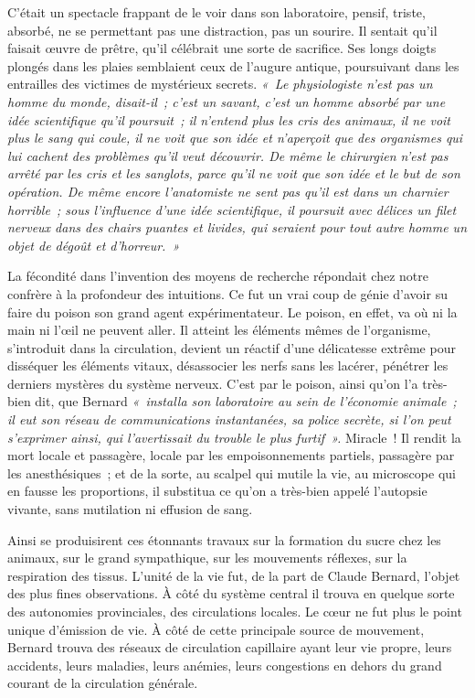 \documentclass[french,twoside]{book} %
\newcommand\persName[1]{#1}
\begin{document}
C’était un spectacle frappant de le voir dans son laboratoire, pensif, triste, absorbé, ne se permettant pas une distraction, pas un sourire. Il sentait qu’il faisait œuvre de prêtre, qu’il célébrait une sorte de sacrifice. Ses longs doigts plongés dans les plaies semblaient ceux de l’augure antique, poursuivant dans les entrailles des victimes de mystérieux secrets. \emph{« Le physiologiste n’est pas un homme du monde, disait-il ; c’est un savant, c’est un homme absorbé par une idée scientifique qu’il poursuit ; il n’entend plus les cris des animaux, il ne voit plus le sang qui coule, il ne voit que son idée et n’aperçoit que des organismes qui lui cachent des problèmes qu’il veut découvrir. De même le chirurgien n’est pas arrêté par les cris et les sanglots, parce qu’il ne voit que son idée et le but de son opération. De même encore l’anatomiste ne sent pas qu’il est dans un charnier horrible ; sous l’influence d’une idée scientifique, il poursuit avec délices un filet nerveux dans des chairs puantes et livides, qui seraient pour tout autre homme un objet de dégoût et d’horreur. »}\par
La fécondité dans l’invention des moyens de recherche répondait chez notre confrère à la profondeur des intuitions. Ce fut un vrai coup de génie d’avoir su faire du poison son grand agent expérimentateur. Le poison, en effet, va où ni la main ni l’œil ne peuvent aller. Il atteint les éléments mêmes de l’organisme, s’introduit dans la circulation, devient un réactif d’une délicatesse extrême pour disséquer les éléments vitaux, désassocier les nerfs sans les lacérer, pénétrer les derniers mystères du système nerveux. C’est par le poison, ainsi qu’on l’a très-bien dit, que {\persName Bernard} \emph{« installa son laboratoire au sein de l’économie animale ; il eut son réseau de communications instantanées, sa police secrète, si l’on peut s’exprimer ainsi, qui l’avertissait du trouble le plus furtif ».} Miracle ! Il rendit la mort locale et passagère, locale par les empoisonnements partiels, passagère par les anesthésiques ; et de la sorte, au scalpel qui mutile la vie, au microscope qui en fausse les proportions, il substitua ce qu’on a très-bien appelé l’autopsie vivante, sans mutilation ni effusion de sang.\par
Ainsi se produisirent ces étonnants travaux sur la formation du sucre chez les animaux, sur le grand sympathique, sur les mouvements réflexes, sur la respiration des tissus. L’unité de la vie fut, de la part de {\persName Claude Bernard}, l’objet des plus fines observations. À côté du système central il trouva en quelque sorte des autonomies provinciales, des circulations locales. Le cœur ne fut plus le point unique d’émission de vie. À côté de cette principale source de mouvement, {\persName Bernard} trouva des réseaux de circulation capillaire ayant leur vie propre, leurs accidents, leurs maladies, leurs anémies, leurs congestions en dehors du grand courant de la circulation générale.\par
\end{document}
